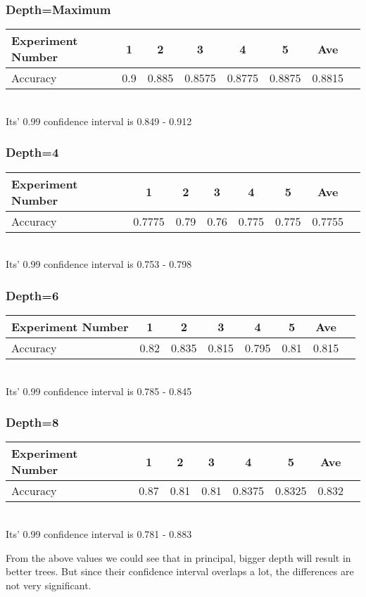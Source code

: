 \subsubsection{Depth=Maximum}
\begin{tabular}{l*{6}{c}r}
	Experiment Number  & 1 & 2 & 3 & 4 & 5  & Ave  \\
	\hline
	Accuracy      & 0.9 & 0.885 & 0.8575 & 0.8775 & 0.8875 & 0.8815   \\
\end{tabular}
\\Its' 0.99 confidence interval is 0.849 - 0.912

\subsubsection{Depth=4}
\begin{tabular}{l*{6}{c}r}
	Experiment Number  & 1 & 2 & 3 & 4 & 5  & Ave  \\
	\hline
	Accuracy      & 0.7775 & 0.79 & 0.76 & 0.775 & 0.775 & 0.7755   \\
\end{tabular}
\\Its' 0.99 confidence interval is 0.753 - 0.798

\subsubsection{Depth=6}
\begin{tabular}{l*{6}{c}r}
	Experiment Number  & 1 & 2 & 3 & 4 & 5  & Ave  \\
	\hline
	Accuracy      & 0.82 & 0.835 & 0.815 & 0.795 & 0.81 &  0.815   \\
\end{tabular}
\\Its' 0.99 confidence interval is 0.785 - 0.845

\subsubsection{Depth=8}
\begin{tabular}{l*{6}{c}r}
	Experiment Number  & 1 & 2 & 3 & 4 & 5  & Ave  \\
	\hline
	Accuracy      & 0.87 & 0.81 & 0.81 & 0.8375 & 0.8325 & 0.832   \\
\end{tabular}
\\Its' 0.99 confidence interval is 0.781 - 0.883

\noindent From the above values we could see that in principal, bigger depth will result in better trees. But since their confidence interval overlaps a lot, the differences are not very significant. 

